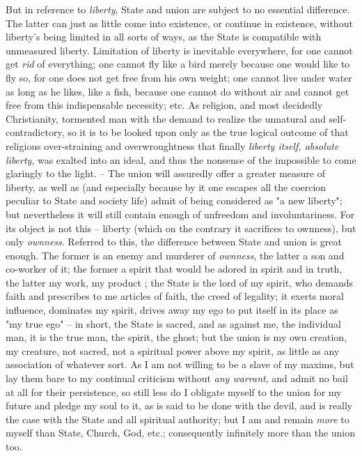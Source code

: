 \documentclass[a4paper]{book}
\begin{document}
 But in reference to \textit{liberty}, State and union are subject to no 
essential difference. The latter can just as little come into existence, or 
continue in existence, without liberty's being limited in all sorts of ways, 
as the State is compatible with unmeasured liberty. Limitation of liberty is 
inevitable everywhere, for one cannot get \textit{rid} of everything; one 
cannot fly like a bird merely because one would like to fly so, for one does 
not get free from his own weight; one cannot live under water as long as he 
likes, like a fish, because one cannot do without air and cannot get free from 
this indispensable necessity; etc. As religion, and most decidedly 
Christianity, tormented man with the demand to realize the unnatural and self- 
contradictory, so it is to be looked upon only as the true logical outcome of 
that religious over-straining and overwroughtness that finally \textit{liberty 
itself, absolute liberty}, was exalted into an ideal, and thus the nonsense of 
the impossible to come glaringly to the light. -- The union will assuredly 
offer a greater measure of liberty, as well as (and especially because by it 
one escapes all the coercion peculiar to State and society life) admit of 
being considered as "{}a new liberty"{}; but nevertheless it will still 
contain enough of unfreedom and involuntariness. For its object is not this -- 
liberty (which on the contrary it sacrifices to ownness), but only 
\textit{ownness}. Referred to this, the difference between State and union is 
great enough. The former is an enemy and murderer of \textit{ownness}, the 
latter a son and co-worker of it; the former a spirit that would be adored in 
spirit and in truth, the latter my work, my product ; the State is the lord of 
my spirit, who demands faith and prescribes to me articles of faith, the creed 
of legality; it exerts moral influence, dominates my spirit, drives away my 
ego to put itself in its place as "{}my true ego"{} -- in short, the State is 
sacred, and as against me, the individual man, it is the true man, the spirit, 
the ghost; but the union is my own creation, my creature, not sacred, not a 
spiritual power above my spirit, as little as any association of whatever 
sort. As I am not willing to be a slave of my maxims, but lay them bare to my 
continual criticism without \textit{any warrant}, and admit no bail at all for 
their persistence, so still less do I obligate myself to the union for my 
future and pledge my soul to it, as is said to be done with the devil, and is 
really the case with the State and all spiritual authority; but I am and 
remain \textit{more} to myself than State, Church, God, etc.; consequently 
infinitely more than the union too.
\end{document}
